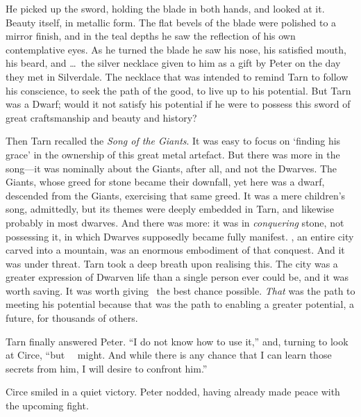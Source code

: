 He picked up the sword, holding the blade in both hands, and looked at it.  Beauty itself, in metallic form.  The flat bevels of the blade were polished to a mirror finish, and in the teal depths he saw the reflection of his own contemplative eyes.  As he turned the blade he saw his nose, his satisfied mouth, his beard, and \ldots\ the silver necklace given to him as a gift by Peter on the day they met in Silverdale.  The necklace that was intended to remind Tarn to follow his conscience, to seek the path of the good, to live up to his potential.  But Tarn was a Dwarf; would it not satisfy his potential  if he were to possess this sword of great craftsmanship and beauty and history?

Then Tarn recalled the \emph{Song of the Giants}.  It was easy to focus on `finding his grace' in the ownership of this great metal artefact.  But there was more in the song---it was nominally about the Giants, after all, and not the Dwarves.  The Giants, whose greed for stone became their downfall, yet here was a dwarf, descended from the Giants, exercising that same greed.  It was a mere children's song, admittedly, but its themes were deeply embedded in Tarn, and likewise probably in most dwarves.  And there was more: it was in \emph{conquering} stone, not possessing it, in which Dwarves supposedly became fully manifest.  \korbarthrond, an entire city carved into a mountain, was an enormous embodiment of that conquest.  And it was under threat.  Tarn took a deep breath upon realising this.  The city was a greater expression of Dwarven life than a single person ever could be, and it was worth saving.  It was worth giving \korbarthrond\ the best chance possible.  \emph{That} was the path to meeting his potential because that was the path to enabling a greater potential, a future, for thousands of others.

Tarn finally answered Peter.  ``I do not know how to use it,''  and, turning to look at Circe, ``but \mothzam\ \driktur\ might.  And while there is any chance that I can learn those secrets from him, I will desire to confront him.''

Circe smiled in a quiet victory.  Peter nodded, having already made peace with the upcoming fight.





